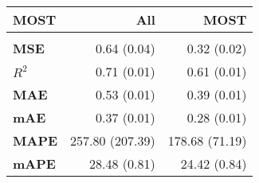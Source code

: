 \centering\begin{tabular}{l|rr}
\toprule
\textbf{MOST} &              All &            MOST \\
\midrule
      &                  &                 \\
\textbf{MSE  } &  0.64 (0.04) &  0.32 (0.02) \\
\textbf{$R^2$} &  0.71 (0.01) &  0.61 (0.01) \\
\textbf{MAE  } &  0.53 (0.01) &  0.39 (0.01) \\
\textbf{mAE  } &  0.37 (0.01) &  0.28 (0.01) \\
\textbf{MAPE } &  257.80 (207.39) &  178.68 (71.19) \\
\textbf{mAPE } &  28.48 (0.81) &  24.42 (0.84) \\
\bottomrule
\end{tabular}
